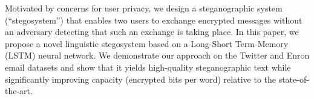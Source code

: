 Motivated by concerns for user privacy, we design a steganographic system (``stegosystem'') that enables two users to exchange encrypted messages without an adversary detecting that such an exchange is taking place. In this paper, we propose a novel linguistic stegosystem based on a Long-Short Term Memory (LSTM) neural network. We demonstrate our approach on the Twitter and Enron email datasets and show that it yields high-quality steganographic text while significantly improving capacity (encrypted bits per word) relative to the state-of-the-art.
